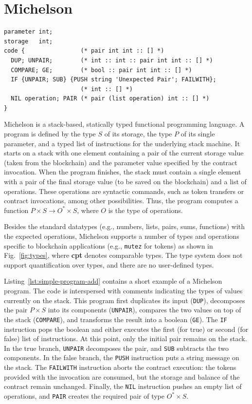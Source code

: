 \documentclass[runningheads]{llncs}
\begin{document}
\section{Michelson}
\label{sec:background}
\lstset{language=michelson}
\begin{lstlisting}[float=tp,captionpos=b,caption={A Michelson program},label={lst:simple-program-add}]
parameter int;
storage   int;
code {                (* pair int int :: [] *)
  DUP; UNPAIR;        (* int :: int :: pair int int :: [] *) 
  COMPARE; GE;        (* bool :: pair int int :: [] *)
  IF {UNPAIR; SUB} {PUSH string 'Unexpected Pair'; FAILWITH};
                      (* int :: [] *)
  NIL operation; PAIR (* pair (list operation) int :: [] *)
}
\end{lstlisting}
Michelson is a stack-based, statically typed functional programming language. A program is defined by the type $S$ of its storage, the type $P$ of its single parameter, and a typed list of instructions for the underlying stack machine. It starts on a stack with one element containing a pair of the current storage value (taken from the blockchain) and the parameter value specified by the contract invocation. When the program finishes, the stack must contain a single element with a pair of the final storage value (to be saved on the blockchain) and a list of operations. These operations are syntactic commands, such as token transfers or contract invocations, among other possibilities. Thus, the program computes a function $P \times S \to O^* \times S$, where $O$ is the type of operations.

Besides the standard datatypes (e.g., numbers, lists, pairs, sums, functions) with the expected operations, Michelson supports a number of types and operations specific to blockchain applications (e.g., \texttt{mutez} for tokens) as shown in Fig.~\ref{fig:types}, where \textbf{cpt} denotes comparable types. The type system does not support quantification over types, and there are no user-defined types.

Listing~\ref{lst:simple-program-add} contains a short example of a Michelson program. The code is interspersed with comments indicating the types of values currently on the stack. This program first duplicates its input (\lstinline|DUP|), decomposes the pair $P \times S$ into its components (\lstinline|UNPAIR|), compares the two values on top of the stack (\lstinline|COMPARE|), and transforms the result into a boolean (\lstinline|GE|). The \lstinline|IF| instruction pops the boolean and either executes the first (for true) or second (for false) list of instructions. At this point, only the initial pair remains on the stack. In the true branch, \lstinline|UNPAIR| decomposes the pair, and \lstinline|SUB| subtracts the two components. In the false branch, the \lstinline|PUSH| instruction puts a string message on the stack. The \lstinline|FAILWITH| instruction aborts the contract execution: the tokens provided with the invocation are consumed, but the storage and balance of the contract remain unchanged. Finally, the \lstinline|NIL| instruction pushes an empty list of operations, and \lstinline|PAIR| creates the required pair of type $O^* \times S$.
\end{document}
